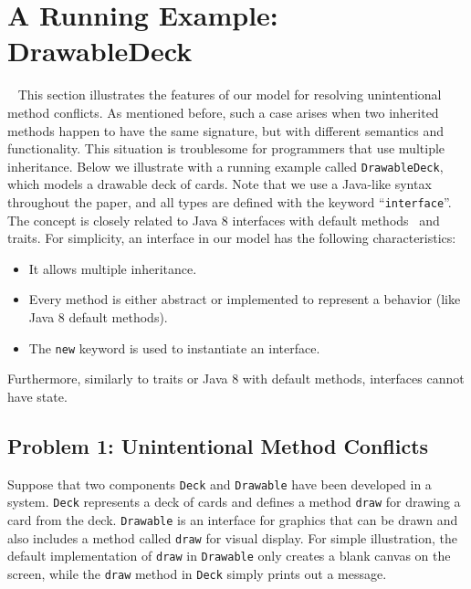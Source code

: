 \section{A Running Example: DrawableDeck}~\label{sec:overview}
This section illustrates the features of our model for
resolving unintentional method conflicts. As mentioned before, such a
case arises when two inherited methods happen to have the same
signature, but with different semantics and functionality. This
situation is troublesome for programmers that use multiple
inheritance. Below we illustrate with a running example called
\lstinline|DrawableDeck|, which models a drawable deck of cards. 
Note that we use a Java-like syntax
throughout the paper, and all types are defined with the keyword
``\lstinline|interface|''. The concept is closely related to Java 8
interfaces with default methods~\cite{bono14} and traits. For simplicity, an interface in our model has
the following characteristics:
\begin{itemize}
  \item It allows multiple inheritance.
  \item Every method is either abstract or implemented to represent a behavior (like Java 8 default methods). 
  \item The \lstinline|new| keyword is used to instantiate an interface.
\end{itemize}
Furthermore, similarly to traits or Java 8 with default methods,
interfaces cannot have state.


\subsection{Problem 1: Unintentional Method Conflicts}
Suppose that two components \lstinline|Deck| and \lstinline|Drawable| 
have been developed in a system. \lstinline|Deck| represents a deck
of cards and defines a method \lstinline|draw| for drawing a card from the
deck.  \lstinline|Drawable| is an interface for graphics that
can be drawn and also includes a method called \lstinline|draw| for
visual display. For simple illustration, the default implementation of
\lstinline|draw| in \lstinline|Drawable| only creates a blank canvas
on the screen, while the \lstinline|draw| method in \lstinline|Deck| simply
prints out a message.

